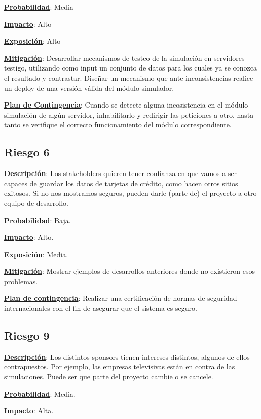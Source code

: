 \textbf{\underline{Probabilidad}}: Media

\textbf{\underline{Impacto}}: Alto

\textbf{\underline{Exposición}}: Alto

\textbf{\underline{Mitigación}}: Desarrollar mecanismos de testeo de la simulación en servidores testigo, utilizando como input un conjunto de datos para los cuales ya se conozca el resultado y contrastar. Diseñar un mecanismo que ante inconsistencias realice un deploy de una versión válida del módulo simulador.

\textbf{\underline{Plan de Contingencia}}: Cuando se detecte alguna incosistencia en el módulo simulación de algún servidor, inhabilitarlo y redirigir las peticiones a otro, hasta tanto se verifique el correcto funcionamiento del módulo correspondiente.


\subsection*{Riesgo 6}
\textbf{\underline{Descripción}}: Los stakeholders quieren tener confianza en que vamos a ser capaces de guardar los datos de tarjetas de crédito, como hacen otros sitios exitosos. Si no nos mostramos seguros, pueden darle (parte de) el proyecto a otro equipo de desarrollo.

\textbf{\underline{Probabilidad}}: Baja.

\textbf{\underline{Impacto}}: Alto.

\textbf{\underline{Exposición}}: Media.

\textbf{\underline{Mitigación}}: Mostrar ejemplos de desarrollos anteriores donde no existieron esos problemas.

\textbf{\underline{Plan de contingencia}}: Realizar una certificación de normas de seguridad internacionales con el fin de asegurar que el sistema es seguro.

\subsection*{Riesgo 9}
\textbf{\underline{Descripción}}: Los distintos sponsors tienen intereses distintos, algunos de ellos contrapuestos. Por ejemplo, las empresas televisivas están en contra de las simulaciones. Puede ser que parte del proyecto cambie o se cancele.

\textbf{\underline{Probabilidad}}: Media.

\textbf{\underline{Impacto}}: Alta.

